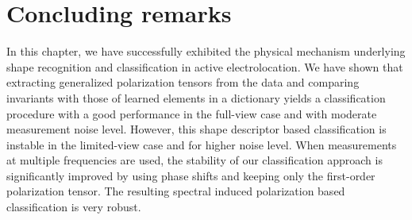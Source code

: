 
\section{Concluding remarks}

In this chapter, we have successfully exhibited the physical
mechanism underlying shape recognition and classification in
active electrolocation. We have shown that extracting generalized
polarization tensors from the data and comparing invariants with
those of learned elements in a dictionary yields a classification
procedure with a good performance in the full-view case and with
moderate measurement noise level. However, this shape descriptor
based classification is instable in the limited-view case and for
higher noise level. When measurements at multiple frequencies are
used, the stability of our classification approach is
significantly improved by using phase shifts and keeping only the
first-order polarization tensor. The resulting spectral induced
polarization based classification is very robust.
